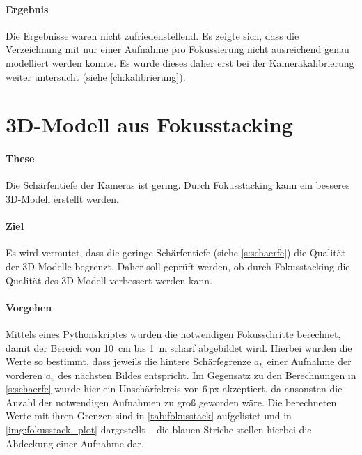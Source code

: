 \documentclass[./00PhotoBox.tex]{subfiles}
\begin{document}
\paragraph{Ergebnis}
Die Ergebnisse waren nicht zufriedenstellend. Es zeigte sich, dass die \Gls{Verzeichnung} mit nur einer Aufnahme pro Fokussierung nicht ausreichend genau modelliert werden konnte. Es wurde dieses daher erst bei der Kamerakalibrierung weiter untersucht (siehe \autoref{ch:kalibrierung}).


\section{3D-Modell aus Fokusstacking}
\label{sec:fokusstacking}


\paragraph{These}
Die Schärfentiefe der Kameras ist gering. Durch Fokusstacking kann ein besseres 3D-Modell erstellt werden.

\paragraph{Ziel}
Es wird vermutet, dass die geringe Schärfentiefe (siehe \autoref{s:schaerfe}) die Qualität der 3D-Modelle begrenzt. Daher soll geprüft werden, ob durch Fokusstacking die Qualität des 3D-Modell verbessert werden kann.

\paragraph{Vorgehen}
Mittels eines Pythonskriptes wurden die notwendigen Fokusschritte berechnet, damit der Bereich von \SI{10}{\centi\metre} bis \SI{1}{\metre} scharf abgebildet wird. Hierbei wurden die Werte so bestimmt, dass jeweils die hintere Schärfegrenze $a_h$ einer Aufnahme der vorderen $a_v$ des nächsten Bildes entspricht. Im Gegensatz zu den Berechnungen in \autoref{s:schaerfe} wurde hier ein Unschärfekreis von $6$\,\gls{px} akzeptiert, da ansonsten die Anzahl der notwendigen Aufnahmen zu groß geworden wäre. Die berechneten Werte mit ihren Grenzen sind in \autoref{tab:fokusstack} aufgelistet und in \autoref{img:fokusstack_plot} dargestellt -- die blauen Striche stellen hierbei die Abdeckung einer Aufnahme dar.
\end{document}
